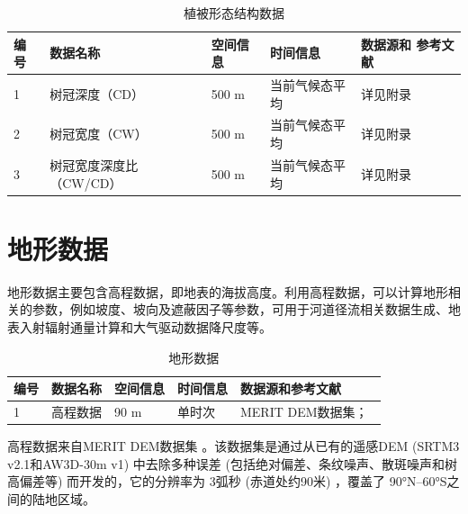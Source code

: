 \begin{table}[htbp]
  \begin{threeparttable}
    \centering
    \caption{植被形态结构数据}
    \label{tab:植被形态结构数据}
    \begin{tabular}{p{1cm}p{4.5cm}p{2cm}p{3cm}p{3cm}}
      \toprule
      编号 & 数据名称                & 空间信息 & 时间信息       & 数据源和 \newline 参考文献 \\
      \midrule
      1    & 树冠深度（CD）          & 500 m    & 当前气候态平均 & 详见附录                   \\
      2    & 树冠宽度（CW）          & 500 m    & 当前气候态平均 & 详见附录                   \\
      3    & 树冠宽度深度比（CW/CD） & 500 m    & 当前气候态平均 & 详见附录                   \\
      \bottomrule
    \end{tabular}
  \end{threeparttable}
\end{table}



\section{地形数据}

地形数据主要包含高程数据，即地表的海拔高度。利用高程数据，可以计算地形相关的参数，例如坡度、坡向及遮蔽因子等参数，可用于河道径流相关数据生成、地表入射辐射通量计算和大气驱动数据降尺度等。

\begin{table}[htbp]
  \begin{threeparttable}
    \centering
    \caption{地形数据}
    \label{tab:地形数据}
    \begin{tabular}{p{1cm}p{3.5cm}p{2cm}p{3cm}p{4cm}}
      \toprule
      编号 & 数据名称 & 空间信息 & 时间信息 & 数据源和参考文献                          \\
      \midrule
      1    & 高程数据 & 90 m     & 单时次   & MERIT DEM数据集；~\cite{yamazaki2017high} \\
      \bottomrule
    \end{tabular}
  \end{threeparttable}
\end{table}

高程数据来自MERIT DEM数据集 \citep{yamazaki2017high}。该数据集是通过从已有的遥感DEM (SRTM3 v2.1和AW3D-30m v1) 中去除多种误差 (包括绝对偏差、条纹噪声、散斑噪声和树高偏差等) 而开发的，它的分辨率为 3弧秒 (赤道处约90米) ，覆盖了 \ang{90;;}N--\ang{60;;}S之间的陆地区域。



